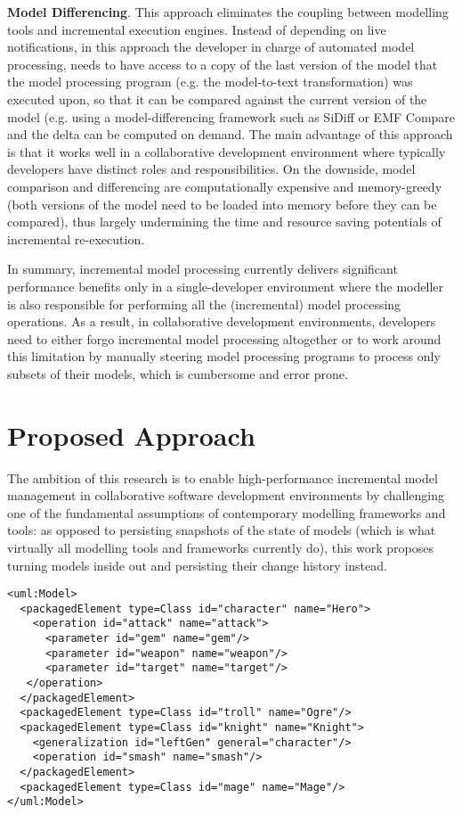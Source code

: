 \textbf{Model Differencing}. This approach eliminates the coupling between modelling tools and incremental execution engines. Instead of depending on live notifications, in this approach the developer in charge of automated model processing, needs to have access to a copy of the last version of the model that the model processing program (e.g. the model-to-text transformation) was executed upon, so that it can be compared against the current version of the model (e.g. using a model-differencing framework such as SiDiff \cite{Treude2007SiDiff} or EMF Compare \cite{eclipse2017compare} and the delta can be computed on demand. The main advantage of this approach is that it works well in a collaborative development environment where typically developers have distinct roles and responsibilities. On the downside, model comparison and differencing are computationally expensive and memory-greedy (both versions of the model need to be loaded into memory before they can be compared), thus largely undermining the time and resource saving potentials of incremental re-execution.

In summary, incremental model processing currently delivers significant performance benefits only in a single-developer environment where the modeller is also responsible for performing all the (incremental) model processing operations. As a result, in collaborative development environments, developers need to either forgo incremental model processing altogether or to work around this limitation by manually steering model processing programs to process only subsets of their models, which is cumbersome and error prone.

\section{Proposed Approach}
\label{sec:proposed_approach}
The ambition of this research is to enable high-performance incremental model management in collaborative software development environments by challenging one of the fundamental assumptions of contemporary modelling frameworks and tools: as opposed to persisting snapshots of the state of models (which is what virtually all modelling tools and frameworks currently do), this work proposes turning models inside out and persisting their change history instead.

\begin{lstlisting}[style=xmi,caption={State-based representation of the model of Figure \ref{fig:class_diagram_left} in (simplified) XMI.},label=lst:xmimodel_left]
<uml:Model>
  <packagedElement type=Class id="character" name="Hero">
    <operation id="attack" name="attack">
      <parameter id="gem" name="gem"/>
      <parameter id="weapon" name="weapon"/>
      <parameter id="target" name="target"/>
   </operation>  
  </packagedElement>
  <packagedElement type=Class id="troll" name="Ogre"/>
  <packagedElement type=Class id="knight" name="Knight">
    <generalization id="leftGen" general="character"/>
    <operation id="smash" name="smash"/>
  </packagedElement>
  <packagedElement type=Class id="mage" name="Mage"/>
</uml:Model>
\end{lstlisting}

